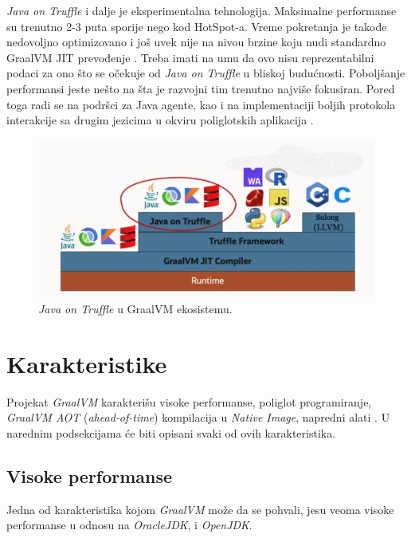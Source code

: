 \documentclass[a4paper]{article}
\begin{document}
\emph{Java on Truffle} i dalje je eksperimentalna tehnologija. Maksimalne performanse su trenutno 2-3 puta sporije nego kod HotSpot-a. Vreme pokretanja je takođe nedovoljno optimizovano i još uvek nije na nivou brzine koju nudi standardno GraalVM JIT prevođenje \cite{graalvm}. Treba imati na umu da ovo nisu reprezentabilni podaci za ono što se očekuje od \emph{Java on Truffle} u bliskoj budućnosti. Poboljšanje performansi jeste nešto na šta je razvojni tim trenutno najviše fokusiran. Pored toga radi se na podršci za Java agente, kao i na implementaciji boljih protokola interakcije sa drugim jezicima u okviru poliglotskih aplikacija \cite{graalvm}.


\begin{figure}
	\begin{center}
	\includegraphics[scale=0.35]{imgs/java_on_truffle.png}
	\end{center}
	\caption{\emph{Java on Truffle} u GraalVM ekosistemu.}
	\label{fig:javaontruffle}
\end{figure}

\section{Karakteristike}
\label{sec:karakteristike}

Projekat \emph{GraalVM} karakterišu visoke performanse, poliglot programiranje, \emph{GraalVM AOT} (\emph{ahead-of-time}) kompilacija u \emph{Native Image}, napredni alati \cite{graalvm}. U narednim podsekcijama će biti opisani svaki od ovih karakteristika.

\subsection{Visoke performanse}
\label{sub:perf}

Jedna od karakteristika kojom \emph{GraalVM} može da se pohvali, jesu veoma visoke performanse u odnosu na \emph{OracleJDK}, i \emph{OpenJDK}. 
\end{document}
